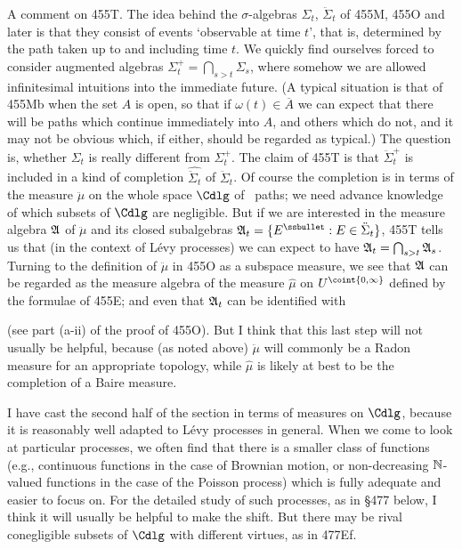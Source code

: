 {A comment on 455T.   The idea behind the $\sigma$-algebras $\Sigma_t$,
$\ddot\Sigma_t$  of 455M, 455O and later is that they consist of events
`observable at time $t$', that is, determined by the path taken up to and
including time $t$.   We quickly find ourselves forced to consider
augmented algebras $\Sigma_t^+=\bigcap_{s>t}\Sigma_s$, where somehow we are
allowed infinitesimal intuitions into the immediate future.   (A typical
situation is that of 455Mb when the set $A$ is open, so that if
$\omega(t)\in\overline{A}$ we can expect that there will be paths which
continue immediately into $A$, and others which do not, and it may not be
obvious which, if either, should be regarded as typical.)   The question
is, whether $\Sigma_t$ is really different from $\Sigma_t^+$.
The claim of 455T is that
$\ddot\Sigma_t^+$ is included in a kind of completion $\hat{\ddot\Sigma_t}$
of $\ddot\Sigma_t$.
Of course the completion is in terms of the measure $\ddot\mu$ on the
whole space $\Cdlg$ of \cadlag\ paths;  we need advance knowledge of which
subsets of $\Cdlg$ are negligible.   But if we are interested in the
measure algebra $\frak A$ of $\ddot\mu$ and its closed subalgebras
$\frak A_t=\{E^{\ssbullet}:E\in\ddot\Sigma_t\}$, 455T tells us that (in the
context of L\'evy processes) we can expect to have
$\frak A_t=\bigcap_{s>t}\frak A_s$.   Turning to the definition of
$\ddot\mu$ in 455O as a subspace measure, we see that $\frak A$ can be
regarded as the measure algebra of the measure $\hat\mu$ on
$U^{\coint{0,\infty}}$ defined by the formulae of 455E;  and even that
$\frak A_t$ can be identified with


\noindent (see part (a-ii) of the proof of 455O).   But I think that this
last step will not usually be helpful, because (as noted above) $\ddot\mu$
will commonly be a Radon measure for an appropriate topology, while
$\hat\mu$ is likely at best to be the completion of a Baire measure.

I have cast the second half of the section in terms of measures on
$\Cdlg$, because it is reasonably well adapted to L\'evy processes in
general.   When we come to look at particular processes, we often find
that there is a smaller class of functions
(e.g., continuous functions in the case of
Brownian motion, or non-decreasing $\Bbb N$-valued functions in the case of
the Poisson process) which is fully adequate and easier to focus on.
For the detailed study of such processes, as in \S477 below, I think it
will usually be helpful to make the shift.   But there may be rival
conegligible subsets of $\Cdlg$ with different virtues, as in 477Ef.
}%

\discrpage

